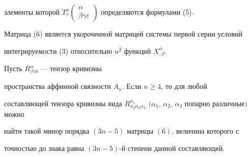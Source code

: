 элементы которой $T^{\sigma}_{\tau}


\left(\begin{smallmatrix}\alpha\\


\beta \gamma \varepsilon\end{smallmatrix}\right)$ определяются формулами (5).


Матрица (6) является укороченной матрицей системы первой серии условий


интегрируемости (3) относительно $n^2$ функций $X^{\alpha}_{,\beta}$.





\begin{thm}


Пусть $R^{\alpha}_{\beta \gamma \delta}$ --- тензор кривизны


пространства аффинной связности $A_n$. Если $n\geq 4$, то для любой


составляющей тензора кривизны вида $ R^{\alpha_1}_{\alpha_2 \alpha_2


\alpha_3}$ $(\alpha_1$, $\alpha_2$, $\alpha_3$ попарно различные$)$ можно


найти такой минор порядка $(3n-5)$ матрицы $(6)$, величина которого с


точностью до знака равна $(3n-5)$-й степени данной составляющей.


\end{thm}





